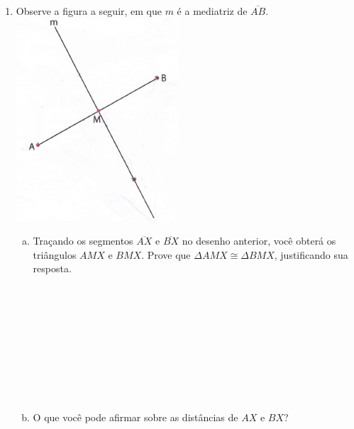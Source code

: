 \documentclass[a4paper,14pt]{article}
\begin{document}
\begin{multicols}{2}
\begin{enumerate}
			\item Observe a figura a seguir, em que $m$ é a mediatriz de $\overline{AB}$.
			\includegraphics[width=1\linewidth]{6FMA123_imagens/imagem2}
			\begin{enumerate}[a)]
				\item Traçando os segmentos $\overline{AX}$ e $\overline{BX}$ no desenho anterior, você obterá os triângulos $AMX$ e $BMX$. Prove que $\Delta$$AMX \cong \Delta$$BMX$, justificando sua resposta. \\\\\\\\\\\\\\\\\\\\ 
				\item O que você pode afirmar sobre as distâncias de $AX$ e $BX$? \\\\\\\\

\end{enumerate}
\end{enumerate}
\end{multicols}
\end{document}
